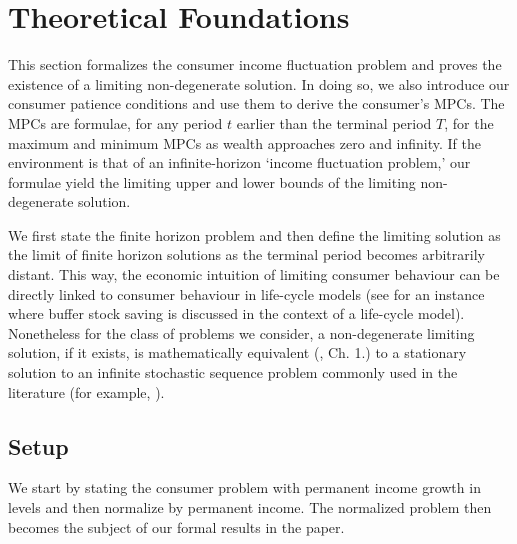\documentclass[\econtexRoot/BufferStockTheory]{subfiles}
\begin{document}
\hypertarget{The-Problem}{}
\section{Theoretical Foundations}\label{sec:Theory}

This section formalizes the consumer income fluctuation problem and proves the existence of a limiting non-degenerate solution. In doing so, we also introduce our consumer patience conditions and use them to derive the consumer's MPCs. The MPCs are formulae, for any period $t$ earlier than the terminal period $T$, for the maximum and minimum MPCs as wealth approaches zero and infinity.  If the environment is that of an infinite-horizon `income fluctuation problem,' our formulae yield the limiting upper and lower bounds of the limiting non-degenerate solution.


We first state the finite horizon problem and then define the limiting solution as the limit of finite horizon solutions as the terminal period becomes arbitrarily distant. This way, the economic intuition of limiting consumer behaviour can be directly linked to consumer behaviour in life-cycle models (see \cite{gpLifeCycle} for an instance where buffer stock saving is discussed in the context of a life-cycle model). Nonetheless for the class of problems we consider, a non-degenerate limiting solution, if it exists, is mathematically equivalent (\cite{bertsekas2012dynamic}, Ch. 1.) to a stationary solution to an infinite stochastic sequence problem commonly used in the literature (for example, \cite{mstIncFluct}). 

\label{sec:Foundations}
\subsection{Setup}\label{subsec:Setup}

We start by stating the consumer problem with permanent income growth in levels and then normalize by permanent income. The normalized problem then becomes the subject of our formal results in the paper. 
\end{document}
